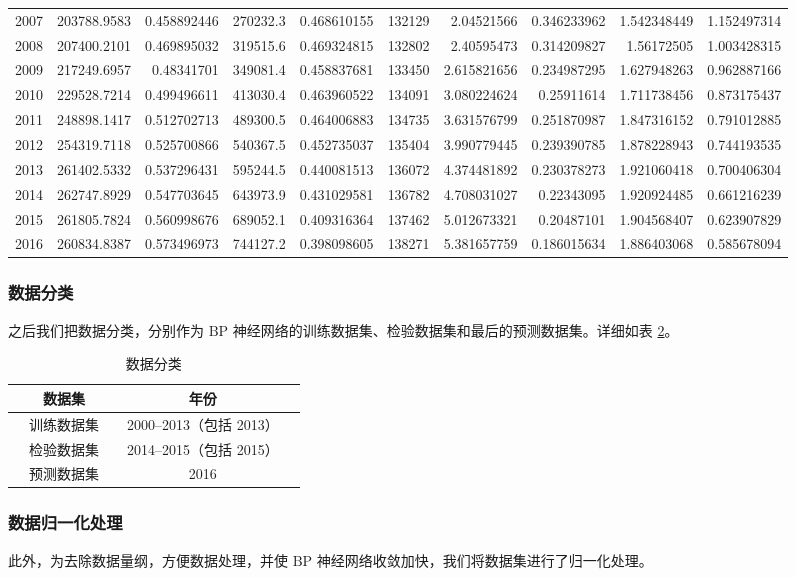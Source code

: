 \begin{table}[hb]
{\begin{tabular}{rrrrrrrrrr}
        2007 & 203788.9583 & 0.458892446 & 270232.3 & 0.468610155 & 132129 & 2.04521566 & 0.346233962 & 1.542348449 & 1.152497314 \\
        2008 & 207400.2101 & 0.469895032 & 319515.6 & 0.469324815 & 132802 & 2.40595473 & 0.314209827 & 1.56172505 & 1.003428315 \\
        2009 & 217249.6957 & 0.48341701 & 349081.4 & 0.458837681 & 133450 & 2.615821656 & 0.234987295 & 1.627948263 & 0.962887166 \\
        2010 & 229528.7214 & 0.499496611 & 413030.4 & 0.463960522 & 134091 & 3.080224624 & 0.25911614 & 1.711738456 & 0.873175437 \\
        2011 & 248898.1417 & 0.512702713 & 489300.5 & 0.464006883 & 134735 & 3.631576799 & 0.251870987 & 1.847316152 & 0.791012885 \\
        2012 & 254319.7118 & 0.525700866 & 540367.5 & 0.452735037 & 135404 & 3.990779445 & 0.239390785 & 1.878228943 & 0.744193535 \\
        2013 & 261402.5332 & 0.537296431 & 595244.5 & 0.440081513 & 136072 & 4.374481892 & 0.230378273 & 1.921060418 & 0.700406304 \\
        2014 & 262747.8929 & 0.547703645 & 643973.9 & 0.431029581 & 136782 & 4.708031027 & 0.22343095 & 1.920924485 & 0.661216239 \\
        2015 & 261805.7824 & 0.560998676 & 689052.1 & 0.409316364 & 137462 & 5.012673321 & 0.20487101 & 1.904568407 & 0.623907829 \\
        2016 & 260834.8387 & 0.573496973 & 744127.2 & 0.398098605 & 138271 & 5.381657759 & 0.186015634 & 1.886403068 & 0.585678094 \\
        \bottomrule[1.5pt]
        \end{tabular}}%
      \label{tab:jutizhi}%
    \end{table}%

  \subsubsection{数据分类}

    之后我们把数据分类，分别作为 $\mathrm{BP}$ 神经网络的训练数据集、检验数据集和最后的预测数据集。详细如表 \ref{tab:shujufenlei}。

    \begin{table}[thb]
      \caption{数据分类}
      \label{tab:shujufenlei}
      \centering
      \begin{tabular*}{0.8\textwidth}{@{\extracolsep{\fill}}ccccc}
        \toprule[1.5pt]
        &数据集 && 年份 &\\
        \midrule[1pt]
        &训练数据集 && 2000--2013（包括 2013） &\\
        &检验数据集 && 2014--2015（包括 2015） &\\
        &预测数据集 && 2016 &\\
        \bottomrule[1.5pt]
      \end{tabular*}
    \end{table}

  \subsubsection{数据归一化处理}

    此外，为去除数据量纲，方便数据处理，并使 $\mathrm{BP}$ 神经网络收敛加快，我们将数据集进行了归一化处理。
